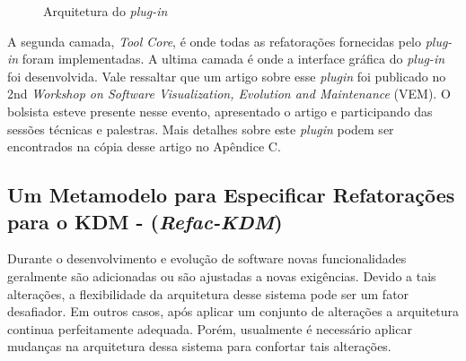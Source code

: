 \begin{figure}[!h]
 \centering
\caption{Arquitetura do \textit{plug-in}}
 \label{fig:architecture}
\end{figure}

A segunda camada, \textit{Tool Core}, é onde todas as refatorações fornecidas pelo \textit{plug-in} foram implementadas. A ultima camada é onde a interface gráfica do \textit{plug-in} foi desenvolvida. Vale ressaltar que um artigo sobre esse \textit{plugin} foi publicado no  2nd \textit{Workshop on Software Visualization, Evolution and Maintenance} (VEM). O bolsista esteve presente nesse evento, apresentado o artigo e participando das sessões técnicas e palestras. Mais detalhes sobre este \textit{plugin} podem ser encontrados na cópia desse artigo no Apêndice C.

\subsection{Um Metamodelo para Especificar Refatorações para o KDM - (\textit{Refac-KDM})}

Durante o desenvolvimento e evolução de software novas funcionalidades geralmente são adicionadas ou são ajustadas a novas exigências. Devido a tais alterações, a flexibilidade da arquitetura desse sistema pode ser um fator desafiador. Em outros casos, após aplicar um conjunto de alterações a arquitetura continua perfeitamente adequada. Porém, usualmente é necessário aplicar mudanças na arquitetura dessa sistema para confortar tais alterações. 

